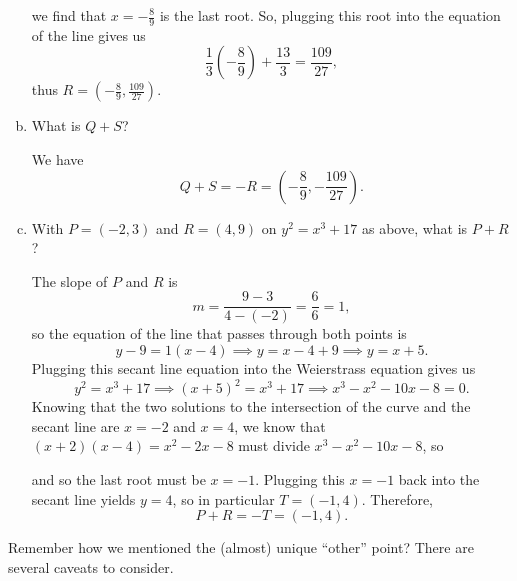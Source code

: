 \documentclass[letterpaper]{article}
\begin{document}
\begin{mdframed}
\begin{enumerate}[(a)]
\begin{mdframed}
            we find that $x = -\frac{8}{9}$ is the last root. So, plugging this root into the equation of the line gives us \[\frac{1}{3}\left(-\frac{8}{9}\right) + \frac{13}{3} = \frac{109}{27},\] thus $R = \left(-\frac{8}{9}, \frac{109}{27}\right)$.
        \end{mdframed}
        \item What is $Q + S$? 
        \begin{mdframed}
            We have \[Q + S = -R = \left(-\frac{8}{9}, -\frac{109}{27}\right).\]
        \end{mdframed}
        \item With $P = (-2, 3)$ and $R = (4, 9)$ on $y^2 = x^3 + 17$ as above, what is $P + R$? 
        \begin{mdframed}
            The slope of $P$ and $R$ is 
            \[m = \frac{9 - 3}{4 - (-2)} = \frac{6}{6} = 1,\]
            so the equation of the line that passes through both points is \[y - 9 = 1(x - 4) \implies y = x - 4 + 9 \implies y = x + 5.\]
            Plugging this secant line equation into the Weierstrass equation gives us 
            \[y^2 = x^3 + 17 \implies (x + 5)^2 = x^3 + 17 \implies x^3 - x^2 - 10x - 8 = 0.\]
            Knowing that the two solutions to the intersection of the curve and the secant line are $x = -2$ and $x = 4$, we know that $(x + 2)(x - 4) = x^2 - 2x - 8$ must divide $x^3 - x^2 - 10x - 8$, so 
            

            and so the last root must be $x = -1$. Plugging this $x = -1$ back into the secant line yields $y = 4$, so in particular $T = (-1, 4)$. Therefore, 
            \[P + R = -T = (-1, 4).\]
        \end{mdframed}
    \end{enumerate}
\end{mdframed}
Remember how we mentioned the (almost) unique ``other'' point? There are several caveats to consider. 
\end{document}
